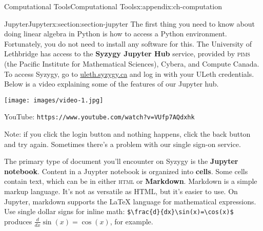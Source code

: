 \documentclass[oneside,10pt,]{book}
\newcommand{\mono}[1]{\texttt{#1}}
\newcommand{\initialism}[1]{\textsc{\MakeLowercase{#1}}}
\newcommand{\terminology}[1]{\textbf{#1}}
\numberwithin{equation}{section}
\newlength{\qrsize}
\newlength{\previewwidth}
\begin{document}
\begin{appendixptx}{Computational Tools}{}{Computational Tools}{}{}{x:appendix:ch-computation}
%
%
\typeout{************************************************}
\typeout{************************************************}
%
\begin{sectionptx}{Jupyter}{}{Jupyter}{}{}{x:section:section-jupyter}
The first thing you need to know about doing linear algebra in Python is how to access a Python environment. Fortunately, you do not need to install any software for this. The University of Lethbridge has access to the \terminology{Syzygy Jupyter Hub} service, provided by \initialism{PIMS} (the Pacific Institute for Mathematical Sciences), Cybera, and Compute Canada. To access Syzygy, go to \href{https://uleth.syzygy.ca}{uleth.syzygy.ca} and log in with your ULeth credentials. Below is a video explaining some of the features of our Jupyter hub.%
\setlength{\qrsize}{9em}
\setlength{\previewwidth}{\linewidth}
\addtolength{\previewwidth}{-\qrsize}
\begin{tcbraster}[raster columns=2, raster column skip=1pt, raster halign=center, raster force size=false, raster left skip=0pt, raster right skip=0pt]%
\begin{tcolorbox}[previewstyle, width=\previewwidth]%
\texttt{[image: images/video-1.jpg]}%
\end{tcolorbox}%
\begin{tcolorbox}[qrstyle]%
{\hypersetup{urlcolor=black}}%
\end{tcolorbox}%
\begin{tcolorbox}[captionstyle]%
\small YouTube: \mono{https://www.youtube.com/watch?v=VUfp7AQdxhk}\end{tcolorbox}%
\end{tcbraster}%
Note: if you click the login button and nothing happens, click the back button and try again. Sometimes there's a problem with our single sign-on service.%
\par
The primary type of document you'll encounter on Syzygy is the \terminology{Jupyter notebook}. Content in a Juypter notebook is organized into \terminology{cells}. Some cells contain text, which can be in either \initialism{HTML} or \terminology{Markdown}. Markdown is a simple markup language. It's not as versatile as HTML, but it's easier to use. On Jupyter, markdown supports the LaTeX language for mathematical expressions. Use single dollar signs for inline math: \mono{\$\textbackslash{}frac\{d\}\{dx\}\textbackslash{}sin(x)=\textbackslash{}cos(x)\$} produces \(\frac{d}{dx}\sin(x)=\cos(x)\), for example.%

\end{sectionptx}
\end{appendixptx}
\end{document}
